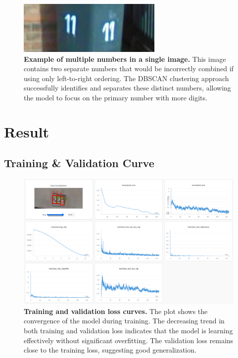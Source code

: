 \documentclass[twocolumn,a4paper]{article}
\begin{document}
\begin{figure}[H]
\centering
\includegraphics[width=0.95\linewidth]{figs/211}
\caption{\textbf{Example of multiple numbers in a single image.} This image contains two separate numbers that would be incorrectly combined if using only left-to-right ordering. The DBSCAN clustering approach successfully identifies and separates these distinct numbers, allowing the model to focus on the primary number with more digits.}
\label{fig:211}
\end{figure}


\section{Result}

\subsection{Training \& Validation Curve}


\begin{figure}[H]
\centering
\includegraphics[width=0.95\linewidth]{figs/screenshot001}
\caption{\textbf{Training and validation loss curves.} The plot shows the convergence of the model during training. The decreasing trend in both training and validation loss indicates that the model is learning effectively without significant overfitting. The validation loss remains close to the training loss, suggesting good generalization.}
\label{fig:screenshot001}
\end{figure}
\end{document}
